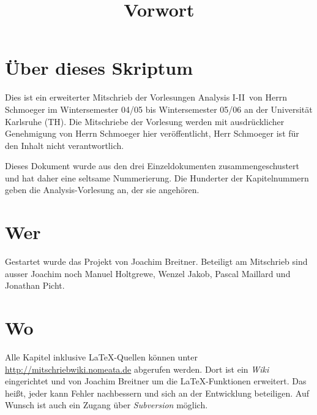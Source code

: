 \documentclass{article}
\title{Vorwort}
\begin{document}
\maketitle

\section{Über dieses Skriptum}
Dies ist ein erweiterter Mitschrieb der Vorlesungen \glqq Analysis I-II\grqq\ von Herrn Schmoeger im
Wintersemester 04/05 bis Wintersemester 05/06 an der Universität Karlsruhe (TH). Die Mitschriebe der Vorlesung werden mit
ausdrücklicher Genehmigung von Herrn Schmoeger hier veröffentlicht, Herr Schmoeger ist für den
Inhalt nicht verantwortlich.

Dieses Dokument wurde aus den drei Einzeldokumenten zusammengeschustert und hat daher eine seltsame Nummerierung. Die Hunderter der Kapitelnummern geben die Analysis-Vorlesung an, der sie angehören.

\section{Wer}
Gestartet wurde das Projekt von Joachim Breitner. Beteiligt am Mitschrieb sind ausser Joachim
noch Manuel Holtgrewe, Wenzel Jakob, Pascal Maillard und Jonathan Picht.

\section{Wo}
Alle Kapitel inklusive \LaTeX-Quellen können unter \url{http://mitschriebwiki.nomeata.de} abgerufen werden.
Dort ist ein \emph{Wiki} eingerichtet und von Joachim Breitner um die \LaTeX-Funktionen erweitert.
Das heißt, jeder kann Fehler nachbessern und sich an der Entwicklung
beteiligen. Auf Wunsch ist auch ein Zugang über \emph{Subversion} möglich.
\end{document}
